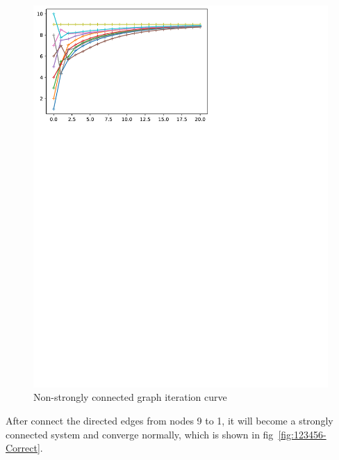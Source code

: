 \documentclass[conference]{IEEEtran}
\begin{document}
\begin{figure}[htbp]
    \centering
    \includegraphics[width=\columnwidth]{123456-Error.pdf}
    \caption{Non-strongly connected graph iteration curve}
    \label{fig:123456-Error}
\end{figure}

After connect the directed edges from nodes 9 to 1, it will become a strongly connected system and converge normally, which is shown in fig~\ref{fig:123456-Correct}.
\end{document}
